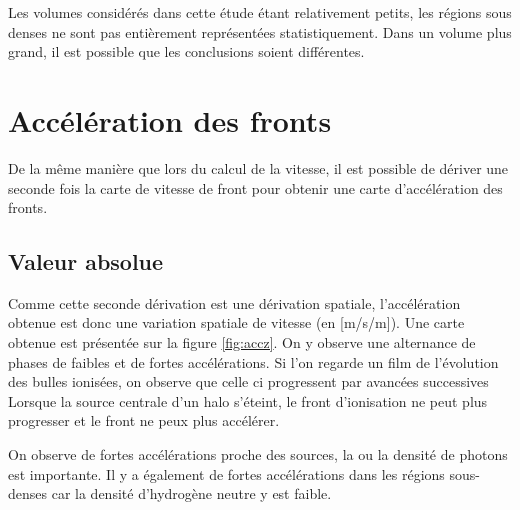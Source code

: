 Les volumes considérés dans cette étude étant relativement petits, les régions sous denses ne sont pas entièrement représentées statistiquement.
Dans un volume plus grand, il est possible que les conclusions soient différentes.





\clearpage
\section{Accélération des fronts}
\label{secaccreio}

De la même manière que lors du calcul de la vitesse, il est possible de dériver une seconde fois la carte de vitesse de front pour obtenir une carte d'accélération des fronts.


\subsection{Valeur absolue}

Comme cette seconde dérivation est une dérivation spatiale, l'accélération obtenue est donc une variation spatiale de vitesse (en [m/s/m]).
Une carte obtenue est présentée sur la figure \ref{fig:accz}.
On y observe une alternance de phases de faibles et de fortes accélérations.
Si l'on regarde un film de l'évolution des bulles ionisées, on observe que celle ci progressent par avancées successives
Lorsque la source centrale d'un halo s’éteint, le front d'ionisation ne peut plus progresser et le front ne peux plus accélérer.

On observe de fortes accélérations proche des sources, la ou la densité de photons est importante.
Il y a également de fortes accélérations dans les régions sous-denses car la densité d'hydrogène neutre y est faible.

